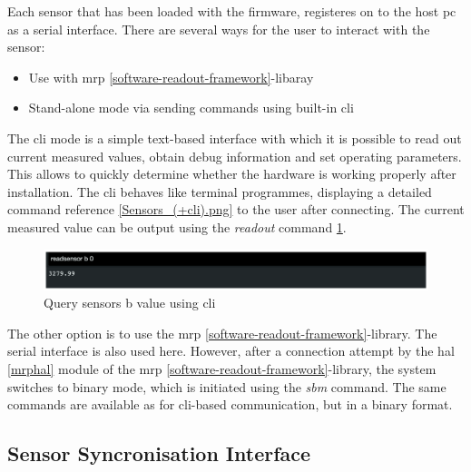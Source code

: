 Each sensor that has been loaded with the firmware, registeres on to the
host \gls{pc} as a serial interface. There are several ways for the user
to interact with the sensor:

\begin{itemize}
\tightlist
\item
  Use with \gls{mrp} \ref{software-readout-framework}-libaray
\item
  Stand-alone mode via sending commands using built-in \gls{cli}
\end{itemize}

The \gls{cli} mode is a simple text-based interface with which it is
possible to read out current measured values, obtain debug information
and set operating parameters. This allows to quickly determine whether
the hardware is working properly after installation. The \gls{cli}
behaves like terminal programmes, displaying a detailed command
reference \ref{Sensors_(+cli).png} to the user after connecting. The
current measured value can be output using the \emph{readout} command
\ref{Query_sensors_b_value_using_(+cli).png}.

\begin{figure}
\centering
\includegraphics{./generated_images/border_Query_sensors_b_value_using_(+cli).png}
\caption{Query sensors b value using \gls{cli}
\label{Query_sensors_b_value_using_(+cli).png}}
\end{figure}

The other option is to use the \gls{mrp}
\ref{software-readout-framework}-library. The serial interface is also
used here. However, after a connection attempt by the \gls{hal}
\ref{mrphal} module of the \gls{mrp}
\ref{software-readout-framework}-library, the system switches to binary
mode, which is initiated using the \emph{sbm} command. The same commands
are available as for \gls{cli}-based communication, but in a binary
format.

\hypertarget{sensor-syncronisation-interface}{%
\subsection{Sensor Syncronisation
Interface}\label{sensor-syncronisation-interface}}

